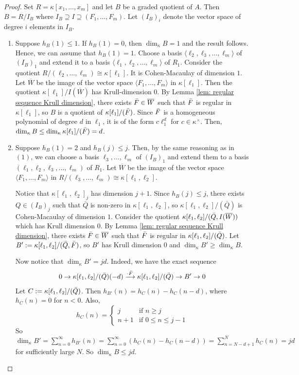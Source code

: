 \documentclass[11pt]{amsart}
\theoremstyle{definition}
\newcommand{\Wb}{\overline{W}}
\newcommand{\Fb}{\Bar{F}}
\newcommand{\dimk}{\dim_{\kappa}}
\newcommand{\ka}{\kappa}
\begin{document}
\begin{proof}
Set $R=\kappa[x_1,\ldots,x_m]$ and let $B$ be a graded quotient of $A$. Then $B=R/I_B$ where $I_B \supseteq  I \supseteq (F_1, \dots, F_m)$. Let $(I_B)_i$ denote the vector space of degree $i$ elements in $I_B$.
\begin{enumerate}
    \item Suppose $h_B(1) \leq 1$. If $h_B(1)=0$, then $\dimk B=1$ and the result follows. Hence, we can assume that $h_B(1)=1$. Choose a basis $\langle\ell_2, \ell_3, \dots, \ell_m\rangle$ of $(I_B)_1$ and extend it to a basis $\langle \ell_1, \ell_2, \dots, \ell_m\rangle$ of $R_1$. Consider the quotient $R/(\ell_2, \dots, \ell_m) \cong \kappa[\ell_1]$. It is Cohen-Macaulay of dimension $1$. Let $\Wb$ be the image of the vector space $\langle F_1, \dots, F_m\rangle$ in $\kappa[\ell_1]$. Then the quotient $\kappa[\ell_1]/ I(\Wb)$ has Krull-dimension $0$. By Lemma \ref{lem: regular sequence Krull dimension}, there exists $\Fb \in \Wb$ such that $\Fb$ is regular in $\ka[\ell_1]$, so $B$ is a quotient of $\ka[\ell_1]/(\Fb)$. Since $\Fb$ is a homogeneous polynomial of degree $d$ in $\ell_1$, it is of the form $c\ell_1^d$ for $c \in \kappa^{\times}$. Then, $\dimk B \leq \dimk \ka[\ell_1]/(\Fb)=d$.
    \item Suppose $h_B(1)=2$ and $h_B(j) \leq j$. Then, by the same reasoning as in $(1)$, we can choose a basis $\ell_3, \dots, \ell_m$ of $(I_B)_1$ and extend them to a basis $(\ell_1, \ell_2, \ell_3, \dots, \ell_m)$ of $R_1$. Let $\Wb$ be the image of the vector space $\langle F_1, \dots, F_m\rangle$ in $R/(\ell_3, \dots, \ell_m) \cong \kappa[\ell_1,\ell_2]$. 
    
    Notice that $\kappa[\ell_1,\ell_2]_{j}$ has dimension $j+1$. Since $h_B(j) \leq j$, there exists $Q \in (I_B)_j$ such that $\bar{Q}$ is non-zero in $\kappa[\ell_1,\ell_2]$, so $\kappa[\ell_1,\ell_2]/(\bar{Q})$ is Cohen-Macaulay of dimension $1$. Consider the quotient $\kappa[\ell_1,\ell_2]/(\Bar{Q},I(\Wb))$ which has Krull dimension $0$. By Lemma \ref{lem: regular sequence Krull dimension}, there exists $\Fb \in \Wb$ such that  $\Fb$ is regular in $\kappa[\ell_1,\ell_2]/(\Bar{Q})$. Let $B':=\kappa[\ell_1,\ell_2]/(\Bar{Q},\Fb)$, so $B'$ has Krull dimension $0$ and $\dimk B' \geq \dimk B$. 

    Now notice that $\dimk B'=jd$. Indeed, we have the exact sequence
    \[0 \to \kappa[\ell_1,\ell_2]/(\Bar{Q})(-d) \xrightarrow{ \cdot \Fb} \kappa[\ell_1,\ell_2]/(\Bar{Q}) \rightarrow B' \to 0\]
Let $C:=\kappa[\ell_1,\ell_2]/(\Bar{Q})$. Then $h_{B'}(n)=h_C(n)-h_C(n-d)$, where $h_C(n)=0$ for $n<0$. Also, \[h_C(n)=\begin{cases}
    j & \text{if } n \geq j \\
    n+1 & \text{if } 0 \leq n \le j-1
\end{cases}\]
So $\dimk B'=\sum_{n=0}^\infty h_{B'}(n)=\sum_{n=0}^\infty (h_C(n)-h_C(n-d))=\sum_{n=N-d+1}^Nh_C(n)=jd$ for sufficiently large $N$. So $\dimk B \leq jd$.
\end{enumerate}
\end{proof}
\end{document}
